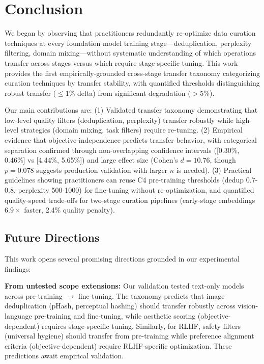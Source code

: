 \section{Conclusion}

We began by observing that practitioners redundantly re-optimize data curation techniques at every foundation model training stage—deduplication, perplexity filtering, domain mixing—without systematic understanding of which operations transfer across stages versus which require stage-specific tuning. This work provides the first empirically-grounded cross-stage transfer taxonomy categorizing curation techniques by transfer stability, with quantified thresholds distinguishing robust transfer ($\leq$1\% delta) from significant degradation ($>$5\%).

Our main contributions are: (1) Validated transfer taxonomy demonstrating that low-level quality filters (deduplication, perplexity) transfer robustly while high-level strategies (domain mixing, task filters) require re-tuning. (2) Empirical evidence that objective-independence predicts transfer behavior, with categorical separation confirmed through non-overlapping confidence intervals ([0.30\%, 0.46\%] vs [4.44\%, 5.65\%]) and large effect size (Cohen's $d=10.76$, though $p=0.078$ suggests production validation with larger $n$ is needed). (3) Practical guidelines showing practitioners can reuse C4 pre-training thresholds (dedup 0.7-0.8, perplexity 500-1000) for fine-tuning without re-optimization, and quantified quality-speed trade-offs for two-stage curation pipelines (early-stage embeddings $6.9\times$ faster, 2.4\% quality penalty).

\subsection{Future Directions}

This work opens several promising directions grounded in our experimental findings:

\textbf{From untested scope extensions:} Our validation tested text-only models across pre-training $\rightarrow$ fine-tuning. The taxonomy predicts that image deduplication (pHash, perceptual hashing) should transfer robustly across vision-language pre-training and fine-tuning, while aesthetic scoring (objective-dependent) requires stage-specific tuning. Similarly, for RLHF, safety filters (universal hygiene) should transfer from pre-training while preference alignment criteria (objective-dependent) require RLHF-specific optimization. These predictions await empirical validation.

